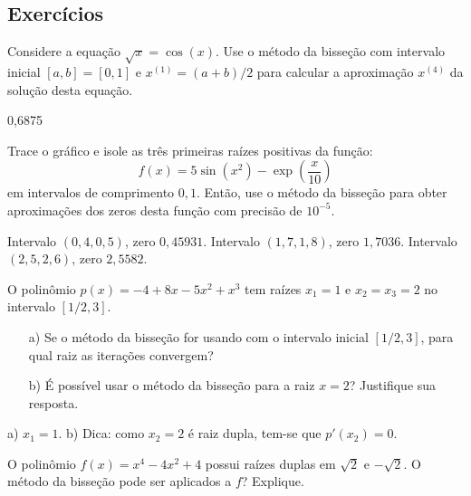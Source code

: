 
\fi

\subsection*{Exercícios}

\begin{exer}Considere a equação $\sqrt{x}=\cos(x)$. Use o método da bisseção com intervalo inicial $[a, b] = [0, 1]$ e $x^{(1)} = (a+b)/2$ para calcular a aproximação $x^{(4)}$ da solução desta equação.
\end{exer}
\begin{resp}
  0,6875
\end{resp}

\begin{exer} Trace o gráfico e isole as três primeiras raízes positivas da função:
  \begin{equation*}
    f(x)=5\sin(x^2)-\exp\left({\frac{x}{10}}\right)  
  \end{equation*}
em intervalos de comprimento $0,1$. Então, use o método da bisseção para obter aproximações dos zeros desta função com precisão de $10^{-5}$.
\end{exer}
\begin{resp}
  Intervalo $(0,4, 0,5)$, zero $0,45931$. Intervalo $(1,7, 1,8)$, zero $1,7036$. Intervalo $(2,5, 2,6)$, zero $2,5582$.
\end{resp}

\begin{exer}\label{exer:raizes_multiplas}
  O polinômio $p(x) = -4 + 8x - 5x^2 + x^3$ tem raízes $x_1=1$ e $x_2=x_3=2$ no intervalo $[1/2, 3]$.
  \begin{itemize}
  \item[a)] Se o método da bisseção for usando com o intervalo inicial $[1/2, 3]$, para qual raiz as iterações convergem?
  \item[b)] É possível usar o método da bisseção para a raiz $x=2$? Justifique sua resposta.
  \end{itemize}
\end{exer}
\begin{resp}
  a) $x_1=1$. b) Dica: como $x_2=2$ é raiz dupla, tem-se que $p'(x_2) = 0$.
\end{resp}

\begin{exer}\label{prob_raiz_dupla} O polinômio $f(x)=x^4-4x^2+4$ possui raízes duplas em $\sqrt{2}$ e $-\sqrt{2}$. O método da bisseção pode ser aplicados a $f$? Explique.
\end{exer}


